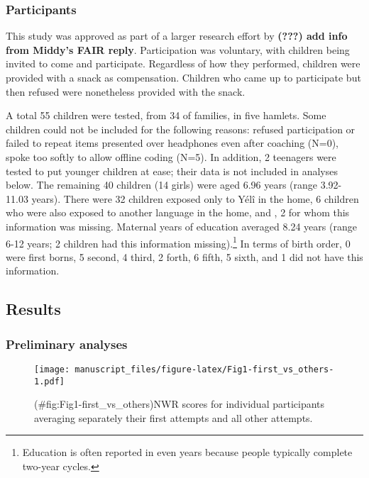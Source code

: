 \documentclass[english,,man]{apa6}
\begin{document}
\hypertarget{participants}{%
\subsubsection{Participants}\label{participants}}

This study was approved as part of a larger research effort by \textbf{({\textbf{???}}) add info from Middy's FAIR reply}. Participation was voluntary, with children being invited to come and participate. Regardless of how they performed, children were provided with a snack as compensation. Children who came up to participate but then refused were nonetheless provided with the snack.

A total 55 children were tested, from 34 of families, in five hamlets. Some children could not be included for the following reasons: refused participation or failed to repeat items presented over headphones even after coaching (N=0), spoke too softly to allow offline coding (N=5). In addition, 2 teenagers were tested to put younger children at ease; their data is not included in analyses below. The remaining 40 children (14 girls) were aged 6.96 years (range 3.92-11.03 years). There were 32 children exposed only to Yélî in the home, 6 children who were also exposed to another language in the home, and , 2 for whom this information was missing. Maternal years of education averaged 8.24 years (range 6-12 years; 2 children had this information missing).\footnote{Education is often reported in even years because people typically complete two-year cycles.} In terms of birth order, 0 were first borns, 5 second, 4 third, 2 forth, 6 fifth, 5 sixth, and 1 did not have this information.

\hypertarget{results}{%
\subsection{Results}\label{results}}

\hypertarget{preliminary-analyses}{%
\subsubsection{Preliminary analyses}\label{preliminary-analyses}}

\begin{figure}
\centering
\texttt{[image: manuscript\_files/figure-latex/Fig1-first\_vs\_others-1.pdf]}
\caption{(\#fig:Fig1-first\_vs\_others)NWR scores for individual participants averaging separately their first attempts and all other attempts.}
\end{figure}
\end{document}
